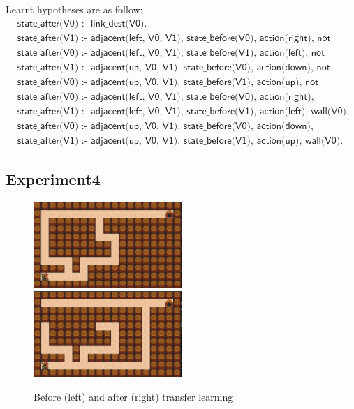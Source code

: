 Learnt hypotheses are as follow:
\begin{equation*}
\begin{split}
&\textsf{state\_after(V0) :- link\_dest(V0).}\\
&\textsf{state\_after(V1) :- adjacent(left, V0, V1), state\_before(V0), action(right), not wall(V1).}\\
&\textsf{state\_after(V0) :- adjacent(left, V0, V1), state\_before(V1), action(left), not wall(V0).}\\
&\textsf{state\_after(V1) :- adjacent(up, V0, V1), state\_before(V0), action(down), not wall(V1).}\\
&\textsf{state\_after(V0) :- adjacent(up, V0, V1), state\_before(V1), action(up), not wall(V0).}\\
&\textsf{state\_after(V0) :- adjacent(left, V0, V1), state\_before(V0), action(right), wall(V1).}\\
&\textsf{state\_after(V1) :- adjacent(left, V0, V1), state\_before(V1), action(left), wall(V0).}\\
&\textsf{state\_after(V0) :- adjacent(up, V0, V1), state\_before(V0), action(down), wall(V1).}\\
&\textsf{state\_after(V1) :- adjacent(up, V0, V1), state\_before(V1), action(up), wall(V0).}
\end{split}
\end{equation*}


\newpage

\subsection{Experiment4}

\begin{figure}[!htb]
\centerline{
\includegraphics[width=0.5\textwidth]{./figures/experiment4_before}
\includegraphics[width=0.5\textwidth]{./figures/experiment4_after}
}
\caption{Before (left) and after (right) transfer learning}
\label{experiment4}
\end{figure}    


